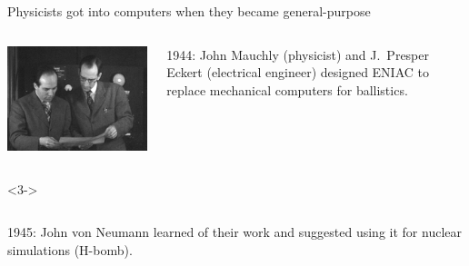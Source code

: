 \documentclass[aspectratio=169]{beamer}
\begin{document}
\begin{frame}{Physicists got into computers when they became general-purpose}
\vspace{0.5 cm}

\begin{columns}
\includegraphics[width=\linewidth]{presper-and-mauchly.jpg}

1944: John Mauchly (physicist) and J.\ Presper Eckert (electrical engineer) designed ENIAC to replace mechanical computers for ballistics.

\vspace{0.25 cm}
\end{columns}

\vspace{0.25 cm}
\begin{uncoverenv}<3->
\begin{columns}
1945: John von Neumann learned of their work and suggested using it for nuclear simulations (H-bomb).

\vspace{0.25 cm}


\end{columns}
\end{uncoverenv}
\end{frame}
\end{document}
